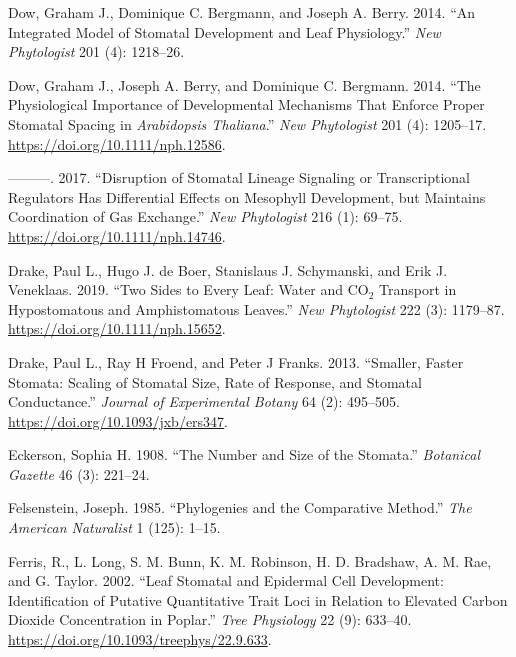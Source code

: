 \documentclass[
  12pt,
]{article}
\newlength{\cslhangindent}
\newlength{\cslentryspacingunit} %
\newenvironment{CSLReferences}[2] %
 {%
  \setlength{\parindent}{0pt}
  \ifodd #1
  \let\oldpar\par
  \def\par{\hangindent=\cslhangindent\oldpar}
  \fi
  \setlength{\parskip}{#2\cslentryspacingunit}
 }%
 {}
\begin{document}
\begin{CSLReferences}{1}{0}
\leavevmode{}%
Dow, Graham J., Dominique C. Bergmann, and Joseph A. Berry. 2014. {``An Integrated Model of Stomatal Development and Leaf Physiology.''} \emph{New Phytologist} 201 (4): 1218--26.

\leavevmode{}%
Dow, Graham J., Joseph A. Berry, and Dominique C. Bergmann. 2014. {``The Physiological Importance of Developmental Mechanisms That Enforce Proper Stomatal Spacing in \emph{{Arabidopsis} Thaliana}.''} \emph{New Phytologist} 201 (4): 1205--17. \url{https://doi.org/10.1111/nph.12586}.

\leavevmode{}%
---------. 2017. {``Disruption of Stomatal Lineage Signaling or Transcriptional Regulators Has Differential Effects on Mesophyll Development, but Maintains Coordination of Gas Exchange.''} \emph{New Phytologist} 216 (1): 69--75. \url{https://doi.org/10.1111/nph.14746}.

\leavevmode{}%
Drake, Paul L., Hugo J. de Boer, Stanislaus J. Schymanski, and Erik J. Veneklaas. 2019. {``Two Sides to Every Leaf: Water and {CO}\(_{\textrm{2}}\) Transport in Hypostomatous and Amphistomatous Leaves.''} \emph{New Phytologist} 222 (3): 1179--87. \url{https://doi.org/10.1111/nph.15652}.

\leavevmode{}%
Drake, Paul L., Ray H Froend, and Peter J Franks. 2013. {``Smaller, Faster Stomata: Scaling of Stomatal Size, Rate of Response, and Stomatal Conductance.''} \emph{Journal of Experimental Botany} 64 (2): 495--505. \url{https://doi.org/10.1093/jxb/ers347}.

\leavevmode{}%
Eckerson, Sophia H. 1908. {``The Number and Size of the Stomata.''} \emph{Botanical Gazette} 46 (3): 221--24.

\leavevmode{}%
Felsenstein, Joseph. 1985. {``Phylogenies and the Comparative Method.''} \emph{The American Naturalist} 1 (125): 1--15.

\leavevmode{}%
Ferris, R., L. Long, S. M. Bunn, K. M. Robinson, H. D. Bradshaw, A. M. Rae, and G. Taylor. 2002. {``Leaf Stomatal and Epidermal Cell Development: Identification of Putative Quantitative Trait Loci in Relation to Elevated Carbon Dioxide Concentration in Poplar.''} \emph{Tree Physiology} 22 (9): 633--40. \url{https://doi.org/10.1093/treephys/22.9.633}.


\end{CSLReferences}
\end{document}
